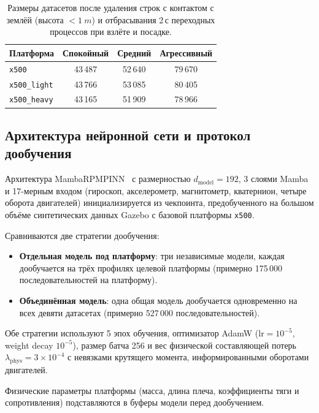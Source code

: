 \begin{table}[htbp]
	\centering
	\caption{Размеры датасетов после удаления строк с контактом с землёй
		(высота $<\SI{1}{m}$) и отбрасывания 2\,с переходных процессов при взлёте и посадке.}
	\label{tab:dataset_sizes}
	\begin{tabular}{lccc}
		\toprule
		\textbf{Платформа} & \textbf{Спокойный} & \textbf{Средний} & \textbf{Агрессивный} \\
		\midrule
		\texttt{x500}        & 43\,487 & 52\,640 & 79\,670 \\
		\texttt{x500\_light} & 43\,766 & 53\,085 & 80\,405 \\
		\texttt{x500\_heavy} & 43\,165 & 51\,909 & 78\,966 \\
		\bottomrule
	\end{tabular}
\end{table}

\subsection{Архитектура нейронной сети и протокол дообучения}
\label{subsec:mp_finetune}

Архитектура MambaRPMPINN~\cite{mamba_ssm,mamba_pinn_ours} с размерностью $d_{\mathrm{model}}=192$, 3 слоями Mamba и 17-мерным входом (гироскоп, акселерометр, магнитометр, кватернион, четыре оборота двигателей) инициализируется из чекпоинта, предобученного на большом объёме синтетических данных Gazebo с базовой платформы \texttt{x500}.

Сравниваются две стратегии дообучения:
\begin{itemize}
	\item \textbf{Отдельная модель под платформу}: три независимые модели, каждая дообучается на трёх профилях целевой платформы (примерно 175\,000 последовательностей на платформу).
	\item \textbf{Объединённая модель}: одна общая модель дообучается одновременно на всех девяти датасетах (примерно 527\,000 последовательностей).
\end{itemize}

Обе стратегии используют 5 эпох обучения, оптимизатор AdamW ($\text{lr}=10^{-5}$, weight decay $10^{-5}$), размер батча 256 и вес физической составляющей потерь $\lambda_{\mathrm{phys}}=3\times10^{-4}$ с невязками крутящего момента, информированными оборотами двигателей.

Физические параметры платформы (масса, длина плеча, коэффициенты тяги и сопротивления) подставляются в буферы модели перед дообучением.

